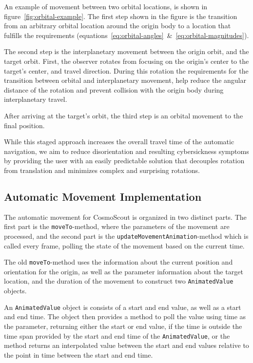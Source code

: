 An example of movement between two orbital locations, is shown in figure~\ref{fig:orbital-example}.
The first step shown in the figure is the transition from an arbitrary orbital location around the origin body to a
location that fulfills the requirements (equations~\ref{eq:orbital-angles}~\&~\ref{eq:orbital-magnitudes}).

The second step is the interplanetary movement between the origin orbit, and the target orbit.
First, the observer rotates from focusing on the origin's center to the target's center, and travel direction.
During this rotation the requirements for the transition between orbital and interplanetary movement, help reduce the
angular distance of the rotation and prevent collision with the origin body during interplanetary travel.

After arriving at the target's orbit, the third step is an orbital movement to the final position.

While this staged approach increases the overall travel time of the automatic navigation, we aim to reduce
disorientation and resulting cybersickness symptoms by providing the user with an easily predictable solution that
decouples rotation from translation and minimizes complex and surprising rotations.


\subsection{Automatic Movement Implementation}\label{subsec:automatic-movement-implementation}

The automatic movement for CosmoScout is organized in two distinct parts.
The first part is the \texttt{moveTo}-method, where the parameters of the movement are processed, and the second
part is the \texttt{updateMovementAnimation}-method which is called every frame, polling the state of the
movement based on the current time.

The old \texttt{moveTo}-method uses the information about the current position and orientation for the origin, as
well as the parameter information about the target location, and the duration of the movement to construct two
\texttt{AnimatedValue} objects.

An \texttt{AnimatedValue} object is consists of a start and end value, as well as a start and end time.
The object then provides a method to poll the value using time as the parameter, returning either the start or
end value, if the time is outside the time span provided by the start and end time of the
\texttt{AnimatedValue}, or the method returns an interpolated value between the start and end values relative
to the point in time between the start and end time.

